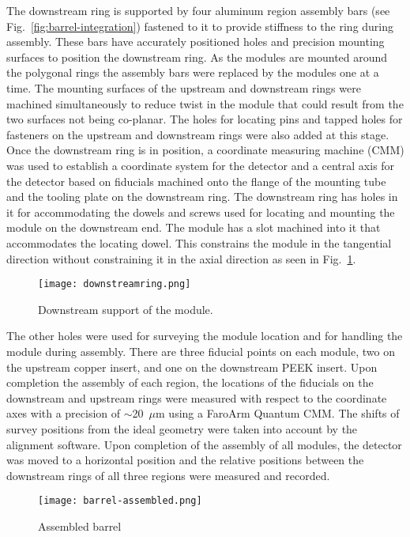 The downstream ring is supported by four aluminum region assembly bars (see Fig.~\ref{fig:barrel-integration}) fastened to it to provide stiffness to the ring during assembly. These bars have accurately positioned holes and precision mounting surfaces to position the downstream ring. As the modules are mounted around the polygonal rings the assembly bars were replaced by the modules one at a time. The mounting surfaces of the upstream and downstream rings were machined simultaneously to reduce twist in the module that could result from the two surfaces not being co-planar. The holes for locating pins and tapped holes for fasteners on the upstream and downstream rings were also added at this stage. Once the downstream ring is in position, a coordinate measuring machine (CMM) was used to establish a coordinate system for the detector and a central axis for the detector based on fiducials machined onto the flange of the mounting tube and the tooling plate on the downstream ring. The downstream ring has holes in it for accommodating the dowels and screws used for locating and mounting the module on the downstream end. The module has a slot machined into it that accommodates the locating dowel. This constrains the module in the tangential direction without constraining it in the axial direction as seen in Fig.~\ref{fig:downstreamring}. 

\begin{figure}[hbt] 
\centering 
\texttt{[image: downstreamring.png]}
\caption{Downstream support of the module.}
\label{fig:downstreamring}
\end{figure}

The other holes were used for surveying the module location and for handling the module during assembly. There are three fiducial points on each module, two on the upstream copper insert, and one on the downstream PEEK insert. Upon completion the assembly of each region, the locations of the fiducials on the downstream and upstream rings were measured with respect to the coordinate axes with a precision of $\sim$20~$\mu$m using a FaroArm Quantum CMM. The shifts of survey positions from the ideal geometry were taken into account by the alignment software. Upon completion of the assembly of all modules, the detector was moved to a horizontal position and the relative positions between the downstream rings of all three regions were measured and recorded.
\begin{figure}[hbt] 
\centering 
\texttt{[image: barrel-assembled.png]}
\caption{Assembled barrel}
\label{fig:barrel-assembled}
\end{figure}

